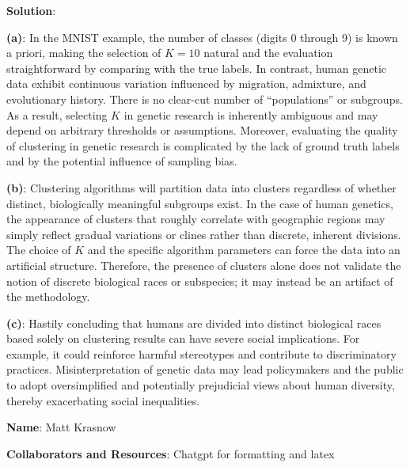 \documentclass[submit]{../harvardml}
\newenvironment{solution}{
    \vspace{2mm}
    \color{blue}\noindent\textbf{Solution}:
}{}
\begin{document}
\begin{solution}
\textbf{(a)}: In the MNIST example, the number of classes (digits 0 through 9) is known a priori, making the selection of $K=10$ natural and the evaluation straightforward by comparing with the true labels. In contrast, human genetic data exhibit continuous variation influenced by migration, admixture, and evolutionary history. There is no clear-cut number of “populations” or subgroups. As a result, selecting $K$ in genetic research is inherently ambiguous and may depend on arbitrary thresholds or assumptions. Moreover, evaluating the quality of clustering in genetic research is complicated by the lack of ground truth labels and by the potential influence of sampling bias.

\textbf{(b)}: Clustering algorithms will partition data into clusters regardless of whether distinct, biologically meaningful subgroups exist. In the case of human genetics, the appearance of clusters that roughly correlate with geographic regions may simply reflect gradual variations or clines rather than discrete, inherent divisions. The choice of $K$ and the specific algorithm parameters can force the data into an artificial structure. Therefore, the presence of clusters alone does not validate the notion of discrete biological races or subspecies; it may instead be an artifact of the methodology.

\textbf{(c)}: Hastily concluding that humans are divided into distinct biological races based solely on clustering results can have severe social implications. For example, it could reinforce harmful stereotypes and contribute to discriminatory practices. Misinterpretation of genetic data may lead policymakers and the public to adopt oversimplified and potentially prejudicial views about human diversity, thereby exacerbating social inequalities.
\end{solution}

\newpage

\textbf{Name}:  Matt Krasnow

\textbf{Collaborators and Resources}:  Chatgpt for formatting and latex
 
\end{document}
